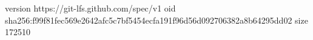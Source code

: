 version https://git-lfs.github.com/spec/v1
oid sha256:f99f81fec569e2642afc5c7bf5454ecfa191f96d56d092706382a8b64295dd02
size 172510
